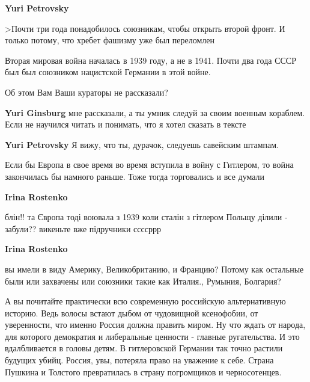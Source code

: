 \begin{itemize}
\begin{itemize}
\begin{itemize}
\end{itemize} %
\textbf{Yuri Petrovsky} 

>Почти три года понадобилось союзникам, чтобы открыть второй фронт. И только
потому, что хребет фашизму уже был переломлен

Вторая мировая война началась в 1939 году, а не в 1941. Почти два года СССР был
был союзником нацистской Германии в этой войне.

Об этом Вам Ваши кураторы не рассказали?

\begin{itemize} %
\textbf{Yuri Ginsburg} мне рассказали, а ты умник следуй за своим военным кораблем. Если не научился читать и понимать, что я хотел сказать в тексте

\textbf{Yuri Petrovsky} Я вижу, что ты, дурачок, следуешь савейским штампам.
\end{itemize} %


Если бы Европа в свое время во время вступила в войну с Гитлером, то война
закончилась бы намного раньше. Тоже тогда торговались и все думали

\begin{itemize} %
\textbf{Irina Rostenko} 

блін!! та Європа тоді воювала з 1939 коли сталін з гітлером Польщу ділили - забули?? викеньте вже підручники ссссррр

\textbf{Irina Rostenko} 

вы имели в виду Америку, Великобританию, и Францию? Потому как остальные были
или захвачены или союзники такие как Италия., Румыния, Болгария?

\end{itemize} %

\end{itemize} %


А вы почитайте практически всю современную российскую альтернативную историю.
Ведь волосы встают дыбом от чудовищной ксенофобии, от уверенности, что именно
Россия должна править миром. Ну что ждать от народа, для которого демократия и
либеральные ценности - главные ругательства. И это вдалбливается в головы
детям. В гитлеровской Германии так точно растили будущих убийц. Россия, увы,
потеряла право на уважение к себе. Страна Пушкина и Толстого превратилась в
страну погромщиков и черносотенцев.


\end{itemize}
